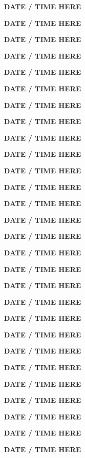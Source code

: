 \documentclass[12pt]{extbook}
\newcommand{\abstract}[2]{{
\begin{center}
\bfseries #1
\end{center}}
\par
}
\begin{document}
\clearpage

\abstract{DATE / TIME HERE}{abstracts/Slagter} %
\abstract{DATE / TIME HERE}{abstracts/Ortega}


\abstract{DATE / TIME HERE}{abstracts/Kipfer} %



\abstract{DATE / TIME HERE}{abstracts/Iwe}


\abstract{DATE / TIME HERE}{abstracts/Marion} %
\abstract{DATE / TIME HERE}{abstracts/Wang}
\abstract{DATE / TIME HERE}{abstracts/Blanc}
\abstract{DATE / TIME HERE}{abstracts/Brennwald}
\abstract{DATE / TIME HERE}{abstracts/Currle} %


\abstract{DATE / TIME HERE}{abstracts/GroegerTrampe}
\abstract{DATE / TIME HERE}{abstracts/vanRooyen} %
\abstract{DATE / TIME HERE}{abstracts/Zhao} %
\abstract{DATE / TIME HERE}{abstracts/Musy} %


\abstract{DATE / TIME HERE}{abstracts/Engelhardt}
\abstract{DATE / TIME HERE}{abstracts/Picard}
\abstract{DATE / TIME HERE}{abstracts/Hillegonds}

\abstract{DATE / TIME HERE}{abstracts/Dutoit} %

\abstract{DATE / TIME HERE}{abstracts/Giroud}
\abstract{DATE / TIME HERE}{abstracts/Lightfoot}
\abstract{DATE / TIME HERE}{abstracts/Roques}

\abstract{DATE / TIME HERE}{abstracts/Strauch_Zimmer} 

\abstract{DATE / TIME HERE}{abstracts/Daskalopoulou} %
\abstract{DATE / TIME HERE}{abstracts/Tomonaga}


\abstract{DATE / TIME HERE}{abstracts/Kimani}
\abstract{DATE / TIME HERE}{abstracts/Mtili}

\abstract{DATE / TIME HERE}{abstracts/Finger} %


\abstract{DATE / TIME HERE}{abstracts/Jacops} %
\abstract{DATE / TIME HERE}{abstracts/vanLeeuw} %




\end{document}
